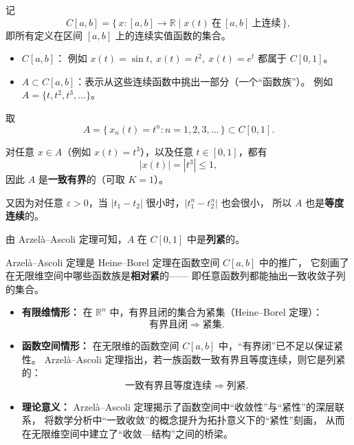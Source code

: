\begin{example}
记
\[
C[a,b] = \{\,x:[a,b]\to\mathbb{R} \mid x(t)\ \text{在}\ [a,b]\ \text{上连续}\,\},
\]
即所有定义在区间 $[a,b]$ 上的连续实值函数的集合。

\begin{itemize}
  \item $C[a,b]$：  
  例如 $x(t)=\sin t,\ x(t)=t^2,\ x(t)=e^t$ 都属于 $C[0,1]$。
  \item $A \subset C[a,b]$：表示从这些连续函数中挑出一部分（一个“函数族”）。  
  例如 $A=\{t, t^2, t^3, \dots\}$。
\end{itemize}

取
\[
A = \{\,x_n(t)=t^n : n=1,2,3,\dots\,\} \subset C[0,1].
\]

对任意 $x\in A$（例如 $x(t)=t^3$），以及任意 $t\in[0,1]$，都有
\[
|x(t)| = |t^3| \le 1,
\]
因此 $A$ 是\textbf{一致有界}的（可取 $K=1$）。

又因为对任意 $\varepsilon>0$，当 $|t_1-t_2|$ 很小时，$|t_1^n - t_2^n|$ 也会很小，
所以 $A$ 也是\textbf{等度连续}的。

由 Arzelà–Ascoli 定理可知，$A$ 在 $C[0,1]$ 中是\textbf{列紧}的。
\end{example}
\begin{proposition}
Arzelà--Ascoli 定理是 Heine--Borel 定理在函数空间 $C[a,b]$ 中的推广，
它刻画了在无限维空间中哪些函数族是\textbf{相对紧}的——
即任意函数列都能抽出一致收敛子列的集合。

\begin{itemize}
  \item[\textbf{(1)}] \textbf{有限维情形：}  
  在 $\mathbb{R}^n$ 中，有界且闭的集合为紧集（Heine--Borel 定理）：
  \[
  \text{有界且闭} \;\Rightarrow\; \text{紧集.}
  \]

  \item[\textbf{(2)}] \textbf{函数空间情形：}  
  在无限维的函数空间 $C[a,b]$ 中，“有界闭”已不足以保证紧性。
  Arzelà--Ascoli 定理指出，若一族函数一致有界且等度连续，则它是列紧的：
  \[
  \text{一致有界且等度连续} \;\Rightarrow\; \text{列紧.}
  \]

  \item[\textbf{(3)}] \textbf{理论意义：}  
  Arzelà--Ascoli 定理揭示了函数空间中“收敛性”与“紧性”的深层联系，
  将数学分析中“一致收敛”的概念提升为拓扑意义下的“紧性”刻画，
  从而在无限维空间中建立了“收敛—结构”之间的桥梁。
\end{itemize}
\end{proposition}































